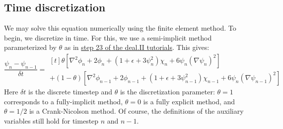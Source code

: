 \documentclass[reqno]{article}
\begin{document}
\subsection{Time discretization}
We may solve this equation numerically using the finite element method.
To begin, we discretize in time.
For this, we use a semi-implicit method parameterized by $\theta$ as in \href{https://www.dealii.org/current/doxygen/deal.II/step_23.html}{step 23 of the deal.II tutorials}.
This gives:
\begin{equation} \label{time-discretization}
    \frac{\psi_n - \psi_{n - 1}}{\delta t}
    =
    \begin{multlined}[t]
    \theta \left[
        \nabla^2 \phi_n
        + 2 \phi_n
        + \left(1 + \epsilon + 3 \psi_n^2 \right) \chi_n
        + 6 \psi_n \left(\nabla \psi_n \right)^2
    \right] \\
    + \left(1 - \theta \right) \left[
        \nabla^2 \phi_{n - 1}
        + 2 \phi_{n - 1}
        + \left(1 + \epsilon + 3 \psi_{n - 1}^2 \right) \chi_{n - 1}
        + 6 \psi_n \left(\nabla \psi_{n - 1} \right)^2
    \right]
    \end{multlined}
\end{equation}
Here $\delta t$ is the discrete timestep and $\theta$ is the discretization parameter: $\theta = 1$ corresponds to a fully-implicit method, $\theta = 0$ is a fully explicit method, and $\theta = 1/2$ is a Crank-Nicolson method.
Of course, the definitions of the auxiliary variables still hold for timestep $n$ and $n - 1$.
\end{document}
